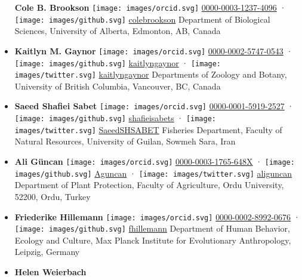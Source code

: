 \begin{itemize}
  \textbf{Cole B. Brookson}
  \texttt{[image: images/orcid.svg]}
  \href{https://orcid.org/0000-0003-1237-4096}{0000-0003-1237-4096}
  · \texttt{[image: images/github.svg]}
  \href{https://github.com/colebrookson}{colebrookson}
  Department of Biological Sciences, University of Alberta, Edmonton, AB, Canada
\item
  \textbf{Kaitlyn M. Gaynor}
  \texttt{[image: images/orcid.svg]}
  \href{https://orcid.org/0000-0002-5747-0543}{0000-0002-5747-0543}
  · \texttt{[image: images/github.svg]}
  \href{https://github.com/kaitlyngaynor}{kaitlyngaynor}
  · \texttt{[image: images/twitter.svg]}
  \href{https://twitter.com/kaitlyngaynor}{kaitlyngaynor}
  Departments of Zoology and Botany, University of British Columbia, Vancouver, BC, Canada
\item
  \textbf{Saeed Shafiei Sabet}
  \texttt{[image: images/orcid.svg]}
  \href{https://orcid.org/0000-0001-5919-2527}{0000-0001-5919-2527}
  · \texttt{[image: images/github.svg]}
  \href{https://github.com/shafieisabets}{shafieisabets}
  · \texttt{[image: images/twitter.svg]}
  \href{https://twitter.com/SaeedSHSABET}{SaeedSHSABET}
  Fisheries Department, Faculty of Natural Resources, University of Guilan, Sowmeh Sara, Iran
\item
  \textbf{Ali Güncan}
  \texttt{[image: images/orcid.svg]}
  \href{https://orcid.org/0000-0003-1765-648X}{0000-0003-1765-648X}
  · \texttt{[image: images/github.svg]}
  \href{https://github.com/Aguncan}{Aguncan}
  · \texttt{[image: images/twitter.svg]}
  \href{https://twitter.com/aliguncan}{aliguncan}
  Department of Plant Protection, Faculty of Agriculture, Ordu University, 52200, Ordu, Turkey
\item
  \textbf{Friederike Hillemann}
  \texttt{[image: images/orcid.svg]}
  \href{https://orcid.org/0000-0002-8992-0676}{0000-0002-8992-0676}
  · \texttt{[image: images/github.svg]}
  \href{https://github.com/fhillemann}{fhillemann}
  Department of Human Behavior, Ecology and Culture, Max Planck Institute for Evolutionary Anthropology, Leipzig, Germany
\item
  \textbf{Helen Weierbach}

\end{itemize}
